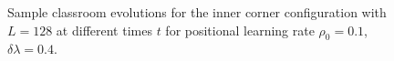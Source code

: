\begin{figure}[htbp!]
    \label{fig:2DBPCAIH sample class evolution low rho}
    \caption{Sample classroom evolutions for the inner corner configuration with $L=128$ at different times $t$ for positional learning rate $\rho_0=0.1$, $\delta\lambda = 0.4$.}
 \end{figure}

